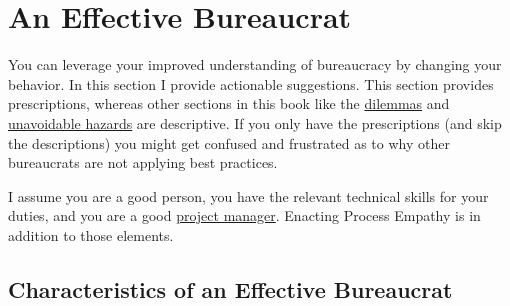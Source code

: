 \section{An Effective Bureaucrat\label{sec:effective-bureaucrat}}

You can leverage your improved understanding of bureaucracy by changing your behavior. In this section I provide actionable suggestions. This section provides prescriptions, whereas other sections in this book like the  
\hyperref[sec:dilemma-trilemma]{dilemmas} 
\iftoggle{haspagenumbers}{ (page~\pageref{sec:dilemma-trilemma})}{}
and 
\hyperref[sec:unavoidable-hazards]{unavoidable hazards} 
\iftoggle{haspagenumbers}{ (page~\pageref{sec:unavoidable-hazards})}{}
are descriptive. If you only have the prescriptions (and skip the descriptions) you might get confused and frustrated as to why other bureaucrats are not applying best practices. 


I assume you are a good person, you have the relevant technical skills for your duties, and you are a good \href{https://en.wikipedia.org/wiki/Project_management}{project manager}.
Enacting Process Empathy is in addition to those elements. 

\subsection*{Characteristics of an Effective Bureaucrat}

